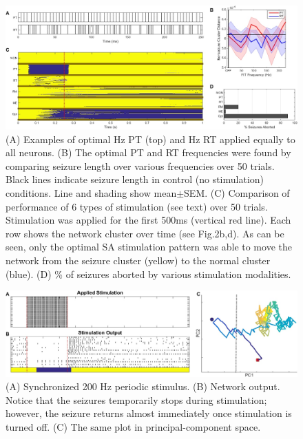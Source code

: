 \documentclass[11pt,a4paper,final]{article}
\begin{document}
\begin{figure}[!ht]
	\centering
	\includegraphics[width=180mm]{MC}
	\caption[Simulated Annealing Monte Carlo Analysis]{
		(A) Examples of optimal \fit{}Hz PT (top) and \rit{}Hz RT applied equally to all \nn{} neurons.
		(B) The optimal PT and RT frequencies were found by comparing seizure length over various frequencies over 50 trials. Black lines indicate seizure length in control (no stimulation) conditions. Line and shading show mean$\pm$SEM.
		(C) Comparison of performance of 6 types of stimulation (see text) over 50 trials. Stimulation was applied for the first 500ms (vertical red line). Each row shows the network cluster over time (see Fig.2b,d). As can be seen, only the optimal SA stimulation pattern was able to move the network from the seizure cluster (yellow) to the normal cluster (blue).
		(D) \% of seizures aborted by various stimulation modalities.
	}
	\label{MC}
\end{figure}

\begin{figure}[!ht]
	\centering
	\includegraphics[width=180mm]{FITstim}
	\caption[Periodic Stimulation]{
		(A) Synchronized 200 Hz periodic stimulus.
		(B) Network output. Notice that the seizures temporarily stops during stimulation; however, the seizure returns almost immediately once stimulation is turned off.
		(C) The same plot in principal-component space.}
	\label{FITstim}
\end{figure}
\end{document}
